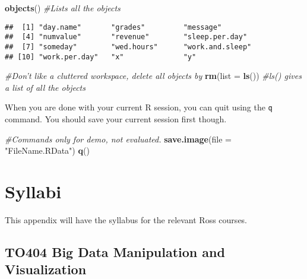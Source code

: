 \documentclass[
]{krantz}
\makeatletter
\newenvironment{Shaded}{\begin{snugshade}}{\end{snugshade}}
\newcommand{\CommentTok}[1]{\textcolor[rgb]{0.37,0.37,0.37}{\textit{#1}}}
\newcommand{\DataTypeTok}[1]{\textcolor[rgb]{0.27,0.27,0.27}{#1}}
\newcommand{\KeywordTok}[1]{\textcolor[rgb]{0.27,0.27,0.27}{\textbf{#1}}}
\newcommand{\NormalTok}[1]{#1}
\newcommand{\StringTok}[1]{\textcolor[rgb]{0.5,0.5,0.5}{#1}}
\newenvironment{kframe}{%
\medskip{}
\setlength{\fboxsep}{.8em}
 \def\at@end@of@kframe{}%
 \ifinner\ifhmode%
  \def\at@end@of@kframe{\end{minipage}}%
  \begin{minipage}{\columnwidth}%
 \fi\fi%
 \def\FrameCommand##1{\hskip\@totalleftmargin \hskip-\fboxsep
 \colorbox{shadecolor}{##1}\hskip-\fboxsep
     \hskip-\linewidth \hskip-\@totalleftmargin \hskip\columnwidth}%
 \MakeFramed {\advance\hsize-\width
   \@totalleftmargin\z@ \linewidth\hsize
   \@setminipage}}%
 {\par\unskip\endMakeFramed%
 \at@end@of@kframe}
\renewenvironment{Shaded}{\begin{kframe}}{\end{kframe}}
\makeatother
\begin{document}
\begin{Shaded}
\begin{Highlighting}[]
\KeywordTok{objects}\NormalTok{() }\CommentTok{#Lists all the objects}
\end{Highlighting}
\end{Shaded}

\begin{verbatim}
##  [1] "day.name"       "grades"         "message"       
##  [4] "numvalue"       "revenue"        "sleep.per.day" 
##  [7] "someday"        "wed.hours"      "work.and.sleep"
## [10] "work.per.day"   "x"              "y"
\end{verbatim}

\begin{Shaded}
\begin{Highlighting}[]
\CommentTok{#Don't like a cluttered workspace, delete all objects by}
\KeywordTok{rm}\NormalTok{(}\DataTypeTok{list =} \KeywordTok{ls}\NormalTok{())  }\CommentTok{#ls() gives a list of all the objects}
\end{Highlighting}
\end{Shaded}

When you are done with your current R session, you can quit using the \texttt{q} command. You should save your current session first though.

\begin{Shaded}
\begin{Highlighting}[]
\CommentTok{#Commands only for demo, not evaluated.}
\KeywordTok{save.image}\NormalTok{(}\DataTypeTok{file =} \StringTok{"FileName.RData"}\NormalTok{)}
\KeywordTok{q}\NormalTok{()}
\end{Highlighting}
\end{Shaded}

\cleardoublepage

\hypertarget{appendix-appendix}{%
\appendix {}}


\hypertarget{syllabi}{%
\chapter{Syllabi}\label{syllabi}}

This appendix will have the syllabus for the relevant Ross courses.

\hypertarget{to404-big-data-manipulation-and-visualization}{%
\section{TO404 Big Data Manipulation and Visualization}\label{to404-big-data-manipulation-and-visualization}}
\end{document}
